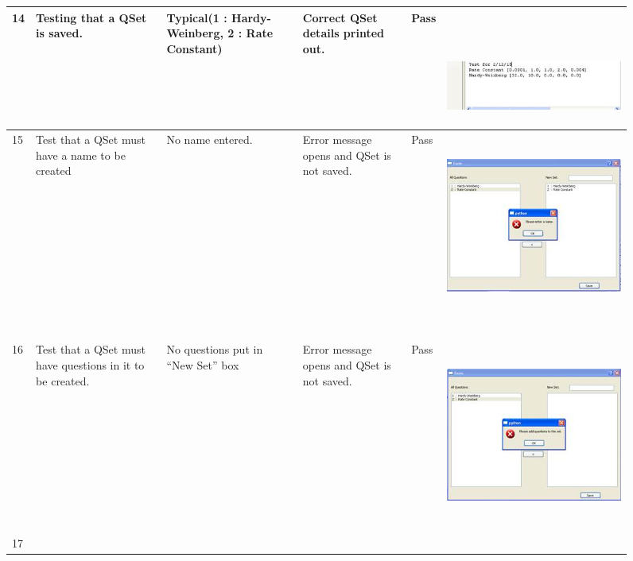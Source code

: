 \documentclass[letterpaper]{article}
\begin{document}
\begin{figure}[hbp]
\begin{minipage}{12.1146in}
\begin{flushleft}
\begin{supertabular}{|m{0.8913598in}|m{1.0997599in}|m{3.3018599in}|m{0.8809598in}|m{0.6198598in}|m{4.84626in}|}
{\color{black} 14} &
{\color{black} Testing that a QSet is saved.} &
{\color{black} Typical(1 : Hardy-Weinberg, 2 : Rate Constant)} &
{\color{black} Correct QSet details printed out.} &
{\color{black} Pass} &
{\color{black} ~}

 \includegraphics[width=3.5728in,height=0.9898in]{Tests_files/image022.jpg} \\\hline
{\color{black} 15} &
{\color{black} Test that a QSet must have a name to be created} &
{\color{black} No name entered.} &
{\color{black} Error message opens and QSet is not saved.} &
{\color{black} Pass} &
{\color{black}  \includegraphics[width=3.2083in,height=2.448in]{Tests_files/image023.jpg} ~~~~~~~~~~~~~~~~~ }\\\hline
{\color{black} 16} &
{\color{black} Test that a QSet must have questions in it to be created.} &
{\color{black} No questions put in ``New Set'' box} &
{\color{black} Error message opens and QSet is not saved.} &
{\color{black} Pass} &
 \includegraphics[width=3.2083in,height=2.4374in]{Tests_files/image024.jpg} \\\hline
{\color{black} 17} &
{\color{black} ~} &
{\color{black} ~} &
{\color{black} ~} &
{\color{black} ~} &
{\color{black} ~}\\\hline
\end{supertabular}
\end{flushleft}
\end{minipage}
\end{figure}
{\color{black}
~}
\end{document}
